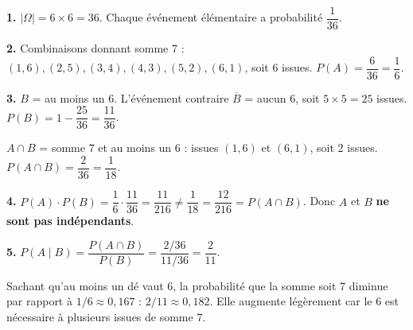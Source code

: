\documentclass[12pt,a4paper]{article}
\begin{document}
\begin{boitecorrige}
\textbf{1.} $|\Omega| = 6\times 6 = 36$. Chaque événement élémentaire a probabilité $\dfrac{1}{36}$.

\textbf{2.} Combinaisons donnant somme 7 : $(1,6),(2,5),(3,4),(4,3),(5,2),(6,1)$, soit 6 issues. $P(A) = \dfrac{6}{36} = \dfrac{1}{6}$.

\textbf{3.} $B$ = au moins un 6. L'événement contraire $\overline B$ = aucun 6, soit $5\times 5 = 25$ issues. $P(B) = 1 - \dfrac{25}{36} = \dfrac{11}{36}$.

$A\cap B$ = somme 7 et au moins un 6 : issues $(1,6)$ et $(6,1)$, soit 2 issues. $P(A\cap B) = \dfrac{2}{36} = \dfrac{1}{18}$.

\textbf{4.} $P(A)\cdot P(B) = \dfrac{1}{6}\cdot\dfrac{11}{36} = \dfrac{11}{216} \neq \dfrac{1}{18} = \dfrac{12}{216} = P(A\cap B)$. Donc $A$ et $B$ \textbf{ne sont pas indépendants}.

\textbf{5.} $P(A\mid B) = \dfrac{P(A\cap B)}{P(B)} = \dfrac{2/36}{11/36} = \dfrac{2}{11}$.

Sachant qu'au moins un dé vaut 6, la probabilité que la somme soit 7 diminue par rapport à $1/6 \approx 0{,}167$ : $2/11 \approx 0{,}182$. Elle augmente légèrement car le 6 est nécessaire à plusieurs issues de somme 7.
\end{boitecorrige}

\ifdefined\inMainDoc\else
\end{document}
